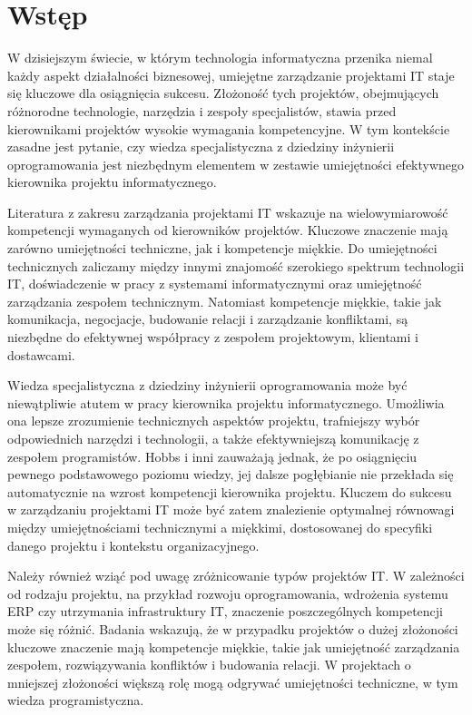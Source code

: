 \newpage %
\section{Wstęp}
W dzisiejszym świecie, w którym technologia informatyczna przenika niemal każdy aspekt działalności biznesowej, umiejętne zarządzanie projektami IT staje się kluczowe dla osiągnięcia sukcesu. Złożoność tych projektów, obejmujących różnorodne technologie, narzędzia i zespoły specjalistów, stawia przed kierownikami projektów wysokie wymagania kompetencyjne. W tym kontekście zasadne jest pytanie, czy wiedza specjalistyczna z dziedziny inżynierii oprogramowania jest niezbędnym elementem w zestawie umiejętności efektywnego kierownika projektu informatycznego. 

Literatura z zakresu zarządzania projektami IT wskazuje na wielowymiarowość kompetencji wymaganych od kierowników projektów. Kluczowe znaczenie mają zarówno umiejętności techniczne, jak i kompetencje miękkie. Do umiejętności technicznych zaliczamy między innymi znajomość szerokiego spektrum technologii IT, doświadczenie w pracy z systemami informatycznymi oraz umiejętność zarządzania zespołem technicznym. \autocite{haggerty}\autocite{langer} Natomiast kompetencje miękkie, takie jak komunikacja, negocjacje, budowanie relacji i zarządzanie konfliktami, są niezbędne do efektywnej współpracy z zespołem projektowym, klientami i dostawcami.

Wiedza specjalistyczna z dziedziny inżynierii oprogramowania może być niewątpliwie atutem w pracy kierownika projektu informatycznego. Umożliwia ona lepsze zrozumienie technicznych aspektów projektu, trafniejszy wybór odpowiednich narzędzi i technologii, a także efektywniejszą komunikację z zespołem programistów. Hobbs i inni zauważają jednak, że po osiągnięciu pewnego podstawowego poziomu wiedzy, jej dalsze pogłębianie nie przekłada się automatycznie na wzrost kompetencji kierownika projektu. \autocite{hobbs} Kluczem do sukcesu w zarządzaniu projektami IT może być zatem znalezienie optymalnej równowagi między umiejętnościami technicznymi a miękkimi, dostosowanej do specyfiki danego projektu i kontekstu organizacyjnego.

Należy również wziąć pod uwagę zróżnicowanie typów projektów IT. W zależności od rodzaju projektu, na przykład rozwoju oprogramowania, wdrożenia systemu ERP czy utrzymania infrastruktury IT, znaczenie poszczególnych kompetencji może się różnić. Badania wskazują, że w przypadku projektów o dużej złożoności kluczowe znaczenie mają kompetencje miękkie, takie jak umiejętność zarządzania zespołem, rozwiązywania konfliktów i budowania relacji. W projektach o mniejszej złożoności większą rolę mogą odgrywać umiejętności techniczne, w tym wiedza programistyczna. \autocite{podgorska}\autocite{jiang}

